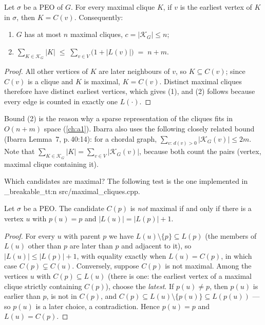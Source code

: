\documentclass[11pt,a4paper,oneside]{report}
\theoremstyle{plain}
\theoremstyle{definition}
\theoremstyle{remark}
\DeclareRobustCommand{\file}[1]{\mtp_breakable_tt:n {#1}}
\newcommand{\KG}{\mathcal{K}_G}
\begin{document}
\begin{lemma}\label{lem:cliques}
Let \(\sigma\) be a PEO of \(G\). For every maximal clique \(K\), if \(v\) is the earliest
vertex of \(K\) in \(\sigma\), then \(K=C(v)\). Consequently:
\begin{enumerate}
\item \(G\) has at most \(n\) maximal cliques, \(c=|\KG|\le n\);
\item \(\displaystyle\sum_{K\in\KG}|K|\;\le\;\sum_{v\in V}\bigl(1+|L(v)|\bigr)\;=\;n+m.\)
\end{enumerate}
\end{lemma}
\begin{proof}
All other vertices of \(K\) are later neighbours of \(v\), so \(K\subseteq C(v)\); since \(C(v)\)
is a clique and \(K\) is maximal, \(K=C(v)\). Distinct maximal cliques therefore have distinct
earliest vertices, which gives (1), and (2) follows because every edge is counted in exactly one
\(L(\cdot)\).
\end{proof}

Bound (2) is the reason why a sparse representation of the cliques fits in \(O(n+m)\) space
(\cref{ch:a1}). Ibarra also uses the following closely related bound (Ibarra Lemma~7,
p.\,40:14): for a chordal graph,
\(\sum_{v:\,d(v)>0}|\KG(v)|\le 2m\). Note that \(\sum_{K\in\KG}|K|=\sum_{v\in V}|\KG(v)|\),
because both count the pairs (vertex, maximal clique containing it).

Which candidates are maximal? The following test is the one implemented in
\file{src/maximal_cliques.cpp}.

\begin{lemma}\label{lem:subsumption}
Let \(\sigma\) be a PEO. The candidate \(C(p)\) is \emph{not} maximal if and only if there is a
vertex \(u\) with \(p(u)=p\) and \(|L(u)|=|L(p)|+1\).
\end{lemma}
\begin{proof}
For every \(u\) with parent \(p\) we have \(L(u)\setminus\{p\}\subseteq L(p)\) (the members of
\(L(u)\) other than \(p\) are later than \(p\) and adjacent to it), so \(|L(u)|\le|L(p)|+1\),
with equality exactly when \(L(u)=C(p)\), in which case \(C(p)\subsetneq C(u)\).
Conversely, suppose \(C(p)\) is not maximal. Among the vertices \(u\) with
\(C(p)\subseteq L(u)\) (there is one: the earliest vertex of a maximal clique strictly
containing \(C(p)\)), choose the \emph{latest}. If \(p(u)\ne p\), then \(p(u)\) is earlier than
\(p\), is not in \(C(p)\), and \(C(p)\subseteq L(u)\setminus\{p(u)\}\subseteq L(p(u))\) --- so
\(p(u)\) is a later choice, a contradiction. Hence \(p(u)=p\) and \(L(u)=C(p)\).
\end{proof}
\end{document}
